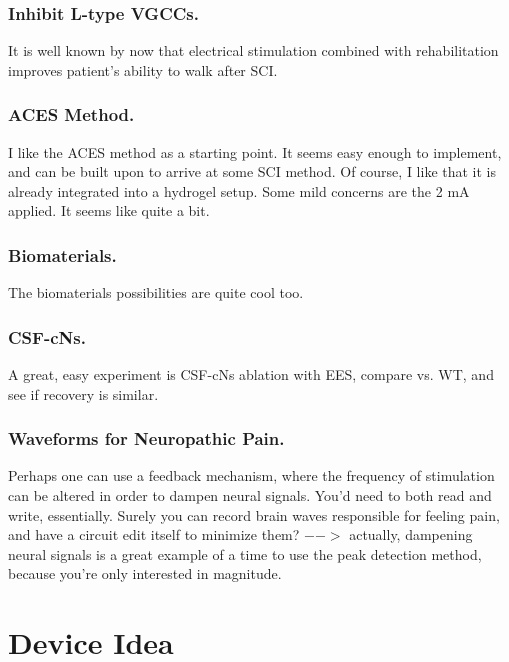 \subsubsection{Inhibit L-type VGCCs.}
It is well known by now that electrical stimulation combined with rehabilitation improves patient's ability to walk after SCI. 

\subsubsection{ACES Method.}

I like the ACES method as a starting point. It seems easy enough to implement, and can be built upon to arrive at some SCI method. Of course, I like that it is already integrated into a hydrogel setup. Some mild concerns are the 2 mA applied. It seems like quite a bit. 

\subsubsection{Biomaterials.}

The biomaterials possibilities are quite cool too. 

\subsubsection{CSF-cNs.}

A great, easy experiment is CSF-cNs ablation with EES, compare vs. WT, and see if recovery is similar.  


\subsubsection{Waveforms for Neuropathic Pain.}
Perhaps one can use a feedback mechanism, where the frequency of stimulation can be altered in order to dampen neural signals. You'd need to both read and write, essentially. Surely you can record brain waves responsible for feeling pain, and have a circuit edit itself to minimize them? $-->$ actually, dampening neural signals is a great example of a time to use the peak detection method, because you're only interested in magnitude. 

\section{Device Idea}

